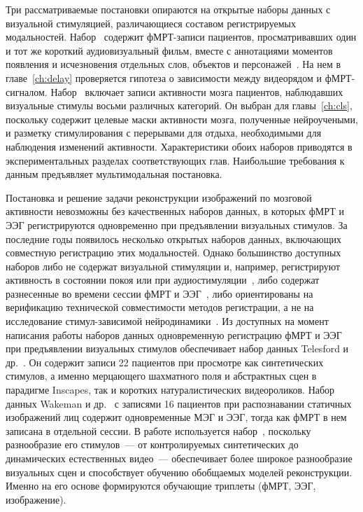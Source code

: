 Три рассматриваемые постановки опираются на открытые наборы данных с визуальной стимуляцией, различающиеся составом регистрируемых модальностей. Набор~\cite{Berezutskaya2022} содержит фМРТ-записи пациентов, просматривавших один и тот же короткий аудиовизуальный фильм, вместе с аннотациями моментов появления и исчезновения отдельных слов, объектов и персонажей~\cite{boersma2018praat, Berezutskaya2020}. На нем в главе~\ref{ch:delay} проверяется гипотеза о зависимости между видеорядом и фМРТ-сигналом. Набор~\cite{haxby2001distributed} включает записи активности мозга пациентов, наблюдавших визуальные стимулы восьми различных категорий. Он выбран для главы~\ref{ch:cls}, поскольку содержит целевые маски активности мозга, полученные нейроучеными, и разметку стимулирования с перерывами для отдыха, необходимыми для наблюдения изменений активности. Характеристики обоих наборов приводятся в экспериментальных разделах соответствующих глав. Наибольшие требования к данным предъявляет мультимодальная постановка.

Постановка и решение задачи реконструкции изображений по мозговой активности невозможны без качественных наборов данных, в которых фМРТ и ЭЭГ регистрируются одновременно при предъявлении визуальных стимулов. За последние годы появилось несколько открытых наборов данных, включающих совместную регистрацию этих модальностей. Однако большинство доступных наборов либо не содержат визуальной стимуляции и, например, регистрируют активность в состоянии покоя или при аудиостимуляции~\cite{Gu2023, Momenian2024}, либо содержат разнесенные во времени сессии фМРТ и ЭЭГ~\cite{Berezutskaya2022}, либо ориентированы на верификацию технической совместимости методов регистрации, а не на исследование стимул-зависимой нейродинамики~\cite{GallegoRudolf2023}. Из доступных на момент написания работы наборов данных одновременную регистрацию фМРТ и ЭЭГ при предъявлении визуальных стимулов обеспечивает набор данных Telesford и др.~\cite{Telesford2023}. Он содержит записи 22 пациентов при просмотре как синтетических стимулов, а именно мерцающего шахматного поля и абстрактных сцен в парадигме Inscapes, так и коротких натуралистических видеороликов. Набор данных Wakeman и др.~\cite{Wakeman2015} с записями 16 пациентов при распознавании статичных изображений лиц содержит одновременные МЭГ и ЭЭГ, тогда как фМРТ в нем записана в отдельной сессии. В работе используется набор~\cite{Telesford2023}, поскольку разнообразие его стимулов~--- от контролируемых синтетических до динамических естественных видео~--- обеспечивает более широкое разнообразие визуальных сцен и способствует обучению обобщаемых моделей реконструкции. Именно на его основе формируются обучающие триплеты (фМРТ, ЭЭГ, изображение).

